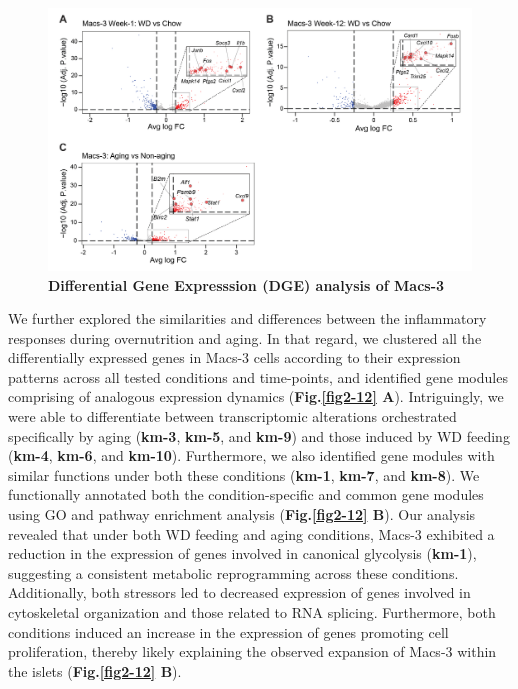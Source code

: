 \begin{figure}[H]
\centering
\includegraphics[width=\linewidth]{Chapter4/Fig/F2-11-01.png}
\caption[res-macs3-1]{\textbf{Differential Gene Expresssion (DGE) analysis of Macs-3}
}
\label{fig2-11}
\end{figure}


We further explored the similarities and differences between the inflammatory responses during overnutrition and aging. In that regard, we clustered all the differentially expressed genes in Macs-3 cells according to their expression patterns across all tested conditions and time-points, and identified gene modules comprising of analogous expression dynamics (\textbf{Fig.\ref{fig2-12} A}). Intriguingly, we were able to differentiate between transcriptomic alterations orchestrated specifically by aging (\textbf{km-3}, \textbf{km-5}, and \textbf{km-9}) and those induced by WD feeding (\textbf{km-4}, \textbf{km-6}, and \textbf{km-10}). Furthermore, we also identified gene modules with similar functions under both these conditions (\textbf{km-1}, \textbf{km-7}, and \textbf{km-8}). We functionally annotated both the condition-specific and common gene modules using GO and pathway enrichment analysis (\textbf{Fig.\ref{fig2-12} B}). Our analysis revealed that under both WD feeding and aging conditions, Macs-3 exhibited a reduction in the expression of genes involved in canonical glycolysis (\textbf{km-1}), suggesting a consistent metabolic reprogramming across these conditions. Additionally, both stressors led to decreased expression of genes involved in cytoskeletal organization and those related to RNA splicing. Furthermore, both conditions induced an increase in the expression of genes promoting cell proliferation, thereby likely explaining the observed expansion of Macs-3 within the islets (\textbf{Fig.\ref{fig2-12} B}).

